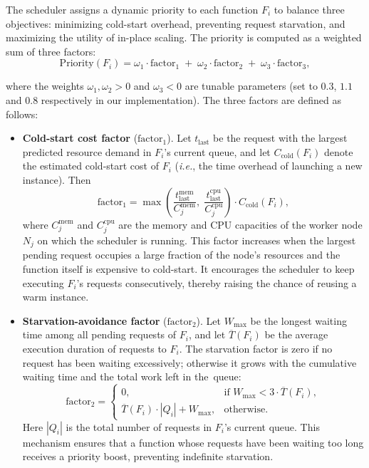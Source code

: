 The scheduler assigns a dynamic priority to each function $F_i$ to balance three 
objectives: minimizing cold-start overhead, preventing request starvation, and 
maximizing the utility of in-place scaling. The priority is computed as a 
weighted sum of three factors:
\[
\text{Priority}(F_i) = \omega_1 \cdot \text{factor}_1 \;+\; \omega_2 \cdot \text{factor}_2 \;+\; \omega_3 \cdot \text{factor}_3,
\]

where the weights $\omega_1, \omega_2 > 0$ and $\omega_3 < 0$ are tunable 
parameters (set to $0.3$, $1.1$ and $0.8$ respectively in our implementation). 
The three factors are defined as follows:

\begin{itemize}
    \item \textbf{Cold-start cost factor} ($\text{factor}_1$).  
    Let $t_{\text{last}}$ be the request with the largest predicted resource demand 
    in $F_i$'s current queue, and let $C_{\text{cold}}(F_i)$ denote the estimated 
    cold-start cost of $F_i$ (\emph{i.e.}, the time overhead of launching a new 
    instance). Then
    \[
    \text{factor}_1 = \max\!\left(\frac{t_{\text{last}}^{\text{mem}}}{C_j^{\text{mem}}},\; \frac{t_{\text{last}}^{\text{cpu}}}{C_j^{\text{cpu}}}\right) \cdot C_{\text{cold}}(F_i),
    \]
    where $C_j^{\text{mem}}$ and $C_j^{\text{cpu}}$ are the memory and CPU 
    capacities of the worker node $N_j$ on which the scheduler is running. This 
    factor increases when the largest pending request occupies a large fraction of 
    the node's resources and the function itself is expensive to cold-start. It 
    encourages the scheduler to keep executing $F_i$'s requests consecutively, 
    thereby raising the chance of reusing a warm instance.

    \item \textbf{Starvation-avoidance factor} ($\text{factor}_2$).  
    Let $W_{\max}$ be the longest waiting time among all pending requests of $F_i$,
    and let $\overline{T}(F_i)$ be the average execution duration of requests to $F_i$.
    The starvation factor is zero if no request has been waiting excessively; otherwise 
    it grows with the cumulative waiting time and the total work left in the~queue:
    \[
    \text{factor}_2 = 
    \begin{cases}
    0, & \text{if } W_{\max} < 3 \cdot \overline{T}(F_i),\\[4pt]
    \overline{T}(F_i) \cdot |Q_i| + W_{\max}, & \text{otherwise}.
    \end{cases}
    \]
    Here $|Q_i|$ is the total number of requests in $F_i$'s current queue. This 
    mechanism ensures that a function whose requests have been waiting too long 
    receives a priority boost, preventing indefinite starvation.


\end{itemize}
